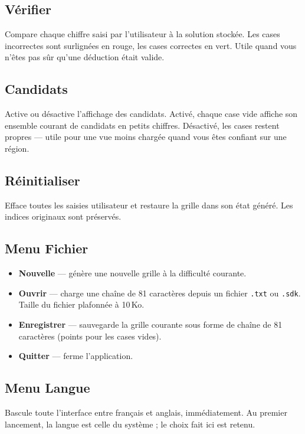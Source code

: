 \subsection{Vérifier}

Compare chaque chiffre saisi par l'utilisateur à la solution stockée.
Les cases incorrectes sont surlignées en rouge, les cases correctes en
vert. Utile quand vous n'êtes pas sûr qu'une déduction était valide.

\subsection{Candidats}

Active ou désactive l'affichage des candidats. Activé, chaque case vide
affiche son ensemble courant de candidats en petits chiffres. Désactivé,
les cases restent propres --- utile pour une vue moins chargée quand
vous êtes confiant sur une région.

\subsection{Réinitialiser}

Efface toutes les saisies utilisateur et restaure la grille dans son
état généré. Les indices originaux sont préservés.

\subsection{Menu Fichier}

\begin{itemize}
  \item \textbf{Nouvelle} --- génère une nouvelle grille à la difficulté courante.
  \item \textbf{Ouvrir} --- charge une chaîne de 81 caractères depuis un fichier
        \texttt{.txt} ou \texttt{.sdk}. Taille du fichier plafonnée à 10\,Ko.
  \item \textbf{Enregistrer} --- sauvegarde la grille courante sous forme de chaîne
        de 81 caractères (points pour les cases vides).
  \item \textbf{Quitter} --- ferme l'application.
\end{itemize}

\subsection{Menu Langue}

Bascule toute l'interface entre français et anglais, immédiatement. Au
premier lancement, la langue est celle du système ; le choix fait ici est
retenu.

